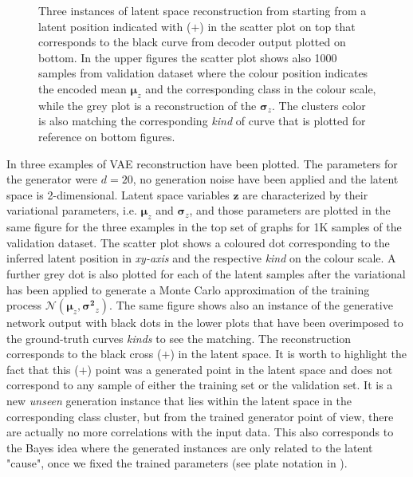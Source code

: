 \begin{figure}
    \caption{ Three instances of latent space reconstruction from  starting from a latent position indicated with ($\bm{+}$) in the scatter plot on top that corresponds to the black curve from decoder output plotted on bottom. In the upper figures the scatter plot shows also 1000 samples from validation dataset where the colour position indicates the encoded mean $\bm{\mu}_z$ and the corresponding class in the colour scale, while the grey plot is a reconstruction of the $\bm{\sigma}_z$. The clusters color is also matching the corresponding \textit{kind} of curve that is plotted for reference on bottom figures.} 
    \label{fig:step_1}
\end{figure}
%
In \Figure{\ref{fig:step_1}} three examples of \acs{VAE} reconstruction have been plotted. The parameters for the generator were $d=20$, no generation noise have been applied and the latent space is 2-dimensional. Latent space variables $\bm{z}$ are characterized by their variational parameters, i.e. $\bm{\mu}_z$ and $\bm{\sigma}_z$, and those parameters are plotted in the same figure for the three examples in the top set of graphs for 1K samples of the validation dataset. The scatter plot shows a coloured dot corresponding to the inferred latent position in \textit{xy-axis} and the respective \textit{kind} on the colour scale. A further grey dot is also plotted for each of the latent samples after the variational has been applied to generate a Monte Carlo approximation of the training process $\mathcal{N}(\bm{\mu}_z, \bm{\sigma^2}_z)$.
The same figure shows also an instance of the generative network output with black dots in the lower plots that have been overimposed to the ground-truth curves \textit{kinds} to see the matching. The reconstruction corresponds to the black cross ($\bm{+}$) in the latent space. It is worth to highlight the fact that this ($\bm{+}$) point was a generated point in the latent space and does not correspond to any sample of either the training set or the validation set. It is a new \textit{unseen} generation instance that lies within the latent space in the corresponding class cluster, but from the trained generator point of view, there are actually no more correlations with the input data. This also corresponds to the Bayes idea where the generated instances are only related to the latent "cause", once we fixed the trained parameters (see plate notation in \Figure{\ref{fig:step1_vae_plate}}).
